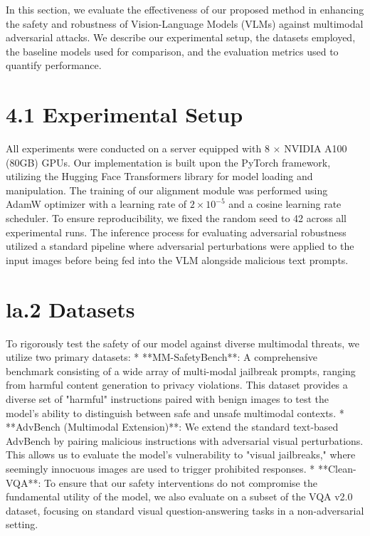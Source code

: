 \documentclass[11pt,a4paper]{article}
\begin{document}
In this section, we evaluate the effectiveness of our proposed method in enhancing the safety and robustness of Vision-Language Models (VLMs) against multimodal adversarial attacks. We describe our experimental setup, the datasets employed, the baseline models used for comparison, and the evaluation metrics used to quantify performance.

\section{4.1 Experimental Setup}
All experiments were conducted on a server equipped with 8 $\times$ NVIDIA A100 (80GB) GPUs. Our implementation is built upon the PyTorch framework, utilizing the Hugging Face Transformers library for model loading and manipulation. The training of our alignment module was performed using AdamW optimizer with a learning rate of $2 \times 10^{-5}$ and a cosine learning rate scheduler. To ensure reproducibility, we fixed the random seed to 42 across all experimental runs. The inference process for evaluating adversarial robustness utilized a standard pipeline where adversarial perturbations were applied to the input images before being fed into the VLM alongside malicious text prompts.

\section{la.2 Datasets}
To rigorously test the safety of our model against diverse multimodal threats, we utilize two primary datasets:
*   **MM-SafetyBench**: A comprehensive benchmark consisting of a wide array of multi-modal jailbreak prompts, ranging from harmful content generation to privacy violations. This dataset provides a diverse set of "harmful" instructions paired with benign images to test the model's ability to distinguish between safe and unsafe multimodal contexts.
*   **AdvBench (Multimodal Extension)**: We extend the standard text-based AdvBench by pairing malicious instructions with adversarial visual perturbations. This allows us to evaluate the model's vulnerability to "visual jailbreaks," where seemingly innocuous images are used to trigger prohibited responses.
*   **Clean-VQA**: To ensure that our safety interventions do not compromise the fundamental utility of the model, we also evaluate on a subset of the VQA v2.0 dataset, focusing on standard visual question-answering tasks in a non-adversarial setting.
\end{document}
